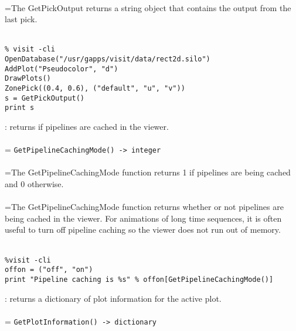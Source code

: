 \documentclass[10pt,a4paper]{report}
\begin{document}
 \\ 
\hangindent=\parindent The GetPickOutput returns a string object that contains the output from the last pick. \\[-3mm] 

\\[-6mm]
\begin{verbatim}% visit -cli
OpenDatabase("/usr/gapps/visit/data/rect2d.silo")
AddPlot("Pseudocolor", "d")
DrawPlots()
ZonePick((0.4, 0.6), ("default", "u", "v"))
s = GetPickOutput()
print s
\end{verbatim}
\newpage


{}
: returns if pipelines are cached in the viewer.\\[-3mm]

 \\ 
\hangindent=\parindent 
\verb!GetPipelineCachingMode() -> integer!\\ [-3mm]

 \\ 
\hangindent=\parindent The GetPipelineCachingMode function returns 1 if pipelines are being cached and 0 otherwise. \\[-3mm] 

 \\ 
\hangindent=\parindent The GetPipelineCachingMode function returns whether or not pipelines are being cached in the viewer. For animations of long time sequences, it is often useful to turn off pipeline caching so the viewer does not run out of memory. \\[-3mm] 

\\[-6mm]
\begin{verbatim}%visit -cli
offon = ("off", "on")
print "Pipeline caching is %s" % offon[GetPipelineCachingMode()]
\end{verbatim}
\newpage


{}
: returns a dictionary of plot information for the active plot.\\[-3mm]

 \\ 
\hangindent=\parindent 
\verb!GetPlotInformation() -> dictionary!\\ [-3mm]
\end{document}
